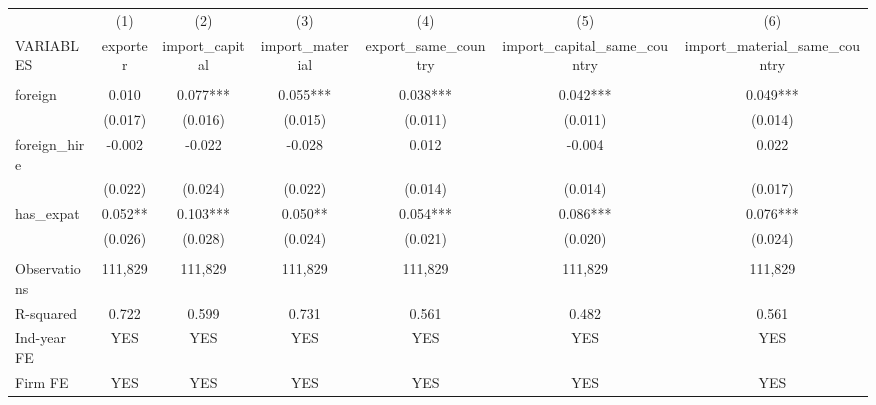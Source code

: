 \begin{tabular}{lcccccc} \hline
 & (1) & (2) & (3) & (4) & (5) & (6) \\
VARIABLES & exporter & import\_capital & import\_material & export\_same\_country & import\_capital\_same\_country & import\_material\_same\_country \\ \hline
 &  &  &  &  &  &  \\
foreign & 0.010 & 0.077*** & 0.055*** & 0.038*** & 0.042*** & 0.049*** \\
 & (0.017) & (0.016) & (0.015) & (0.011) & (0.011) & (0.014) \\
foreign\_hire & -0.002 & -0.022 & -0.028 & 0.012 & -0.004 & 0.022 \\
 & (0.022) & (0.024) & (0.022) & (0.014) & (0.014) & (0.017) \\
has\_expat & 0.052** & 0.103*** & 0.050** & 0.054*** & 0.086*** & 0.076*** \\
 & (0.026) & (0.028) & (0.024) & (0.021) & (0.020) & (0.024) \\
 &  &  &  &  &  &  \\
Observations & 111,829 & 111,829 & 111,829 & 111,829 & 111,829 & 111,829 \\
R-squared & 0.722 & 0.599 & 0.731 & 0.561 & 0.482 & 0.561 \\
Ind-year FE & YES & YES & YES & YES & YES & YES \\
 Firm FE & YES & YES & YES & YES & YES & YES \\ \hline
\end{tabular}
